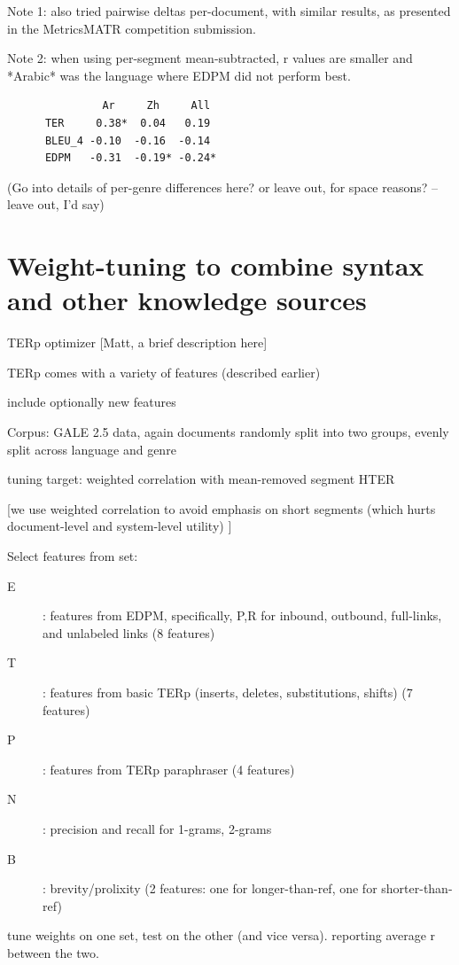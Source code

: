\documentclass{kluwer}    %
\begin{document}
\begin{article}
  Note 1: also tried pairwise deltas per-document, with similar
  results, as presented in the MetricsMATR competition submission.

  Note 2: when using per-segment mean-subtracted, r values are smaller
  and *Arabic* was the language where EDPM did not perform best.

\begin{verbatim}
               Ar     Zh     All
      TER     0.38*  0.04   0.19
      BLEU_4 -0.10  -0.16  -0.14
      EDPM   -0.31  -0.19* -0.24*
\end{verbatim}

  (Go into details of per-genre differences here? or leave out, for
  space reasons? -- leave out, I'd say)

\section{Weight-tuning to combine syntax and other knowledge sources}
\label{sec:hter2}

TERp optimizer [Matt, a brief description here]

TERp comes with a variety of features (described earlier)

include optionally new features

Corpus: GALE 2.5 data, again documents randomly split into two groups,
evenly split across language and genre

tuning target: weighted correlation with mean-removed segment HTER

[we use weighted correlation to avoid emphasis on short segments
(which hurts document-level and system-level utility) ]

Select features from set:

\begin{description}
\item[E]: features from EDPM, specifically, P,R for inbound, outbound,
  full-links, and unlabeled links  (8 features)
\item[T]: features from basic TERp
  (inserts, deletes, substitutions, shifts)  (7 features)
\item[P]: features from TERp paraphraser
  (4 features)
\item[N]: precision and recall for 1-grams, 2-grams
\item[B]: brevity/prolixity (2 features: one for longer-than-ref, one for
  shorter-than-ref)
\end{description}

tune weights on one set, test on the other (and vice versa).
reporting average r between the two.


\end{article}
\end{document}
